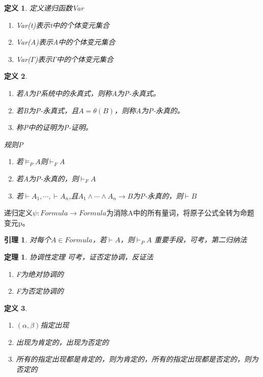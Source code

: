\documentclass[a4paper]{ctexart}
\newtheorem{thm}{\hspace{2em}定理}[subsection]
\newtheorem{lem}{\hspace{2em}引理}
\newtheorem{defi}{\hspace{2em}定义}[subsection]
\newcommand{\shade}[1]{\colorbox{shadecolor}{#1}}
\begin{document}
\begin{defi}
  定义递归函数Var
  \begin{enumerate}[itemindent=2em]
    \item Var(t)表示t中的个体变元集合
    \item Var(A)表示A中的个体变元集合
    \item Var($\Gamma$)表示$\Gamma$中的个体变元集合
  \end{enumerate}
\end{defi}

\begin{defi}
  \begin{enumerate}[itemindent=2em]
    \item 若A为P系统中的永真式，则称A为P-永真式。
    \item 若B为P-永真式，且$A=\theta(B)$，则称A为P-永真的。
    \item 称P中的证明为P-证明。
  \end{enumerate}
  \emph{规则P}
  \begin{enumerate}
    \item 若$\models_PA$则$\vdash_FA$
    \item 若A为P-永真的，则$\vdash_FA$
    \item 若$\vdash A_1,\cdots,\vdash A_n$,且$A_1\wedge\cdots\wedge A_n\rightarrow B$为P-永真的，则$\vdash B$
  \end{enumerate}
\end{defi}

递归定义$\psi:Formula\rightarrow Formula$为消除A中的所有量词，将原子公式全转为命题变元p。
\begin{lem}
  对每个$A\in Formula$，若$\vdash A$，则$\vdash_PA$ \shade{重要手段，可考，第二归纳法}
\end{lem}

\begin{thm}
  协调性定理 \shade{可考，证否定协调，反证法}
  \begin{enumerate}[itemindent=2em]
    \item F为绝对协调的
    \item F为否定协调的 
  \end{enumerate}
\end{thm}

\begin{defi}
  \begin{enumerate}[itemindent=2em]
    \item $(\alpha,\beta)$指定出现
    \item 出现为肯定的，出现为否定的
    \item 所有的指定出现都是肯定的，则为肯定的，所有的指定出现都是否定的，则为否定的
  \end{enumerate}
\end{defi}
\end{document}
